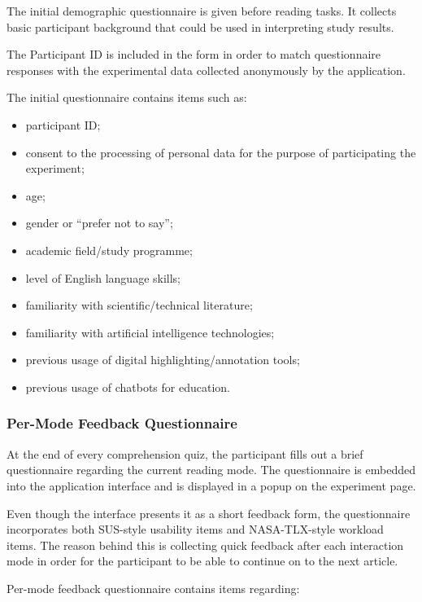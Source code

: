 \documentclass{IEEEtran}
\begin{document}
The initial demographic questionnaire is given before reading tasks. It collects basic participant background that could be used in interpreting study results.

The Participant ID is included in the form in order to match questionnaire responses with the experimental data collected anonymously by the application.

The initial questionnaire contains items such as:

\begin{itemize}
    \item participant ID;
    \item consent to the processing of personal data for the purpose of participating the experiment;
    \item age;
    \item gender or “prefer not to say”;
    \item academic field/study programme;
    \item level of English language skills;
    \item familiarity with scientific/technical literature;
    \item familiarity with artificial intelligence technologies;
    \item previous usage of digital highlighting/annotation tools;
    \item previous usage of chatbots for education.
    
\end{itemize}

\subsubsection{Per-Mode Feedback Questionnaire}

At the end of every comprehension quiz, the participant fills out a brief questionnaire regarding the current reading mode. The questionnaire is embedded into the application interface and is displayed in a popup on the experiment page.

Even though the interface presents it as a short feedback form, the questionnaire incorporates both SUS-style usability items and NASA-TLX-style workload items. The reason behind this is collecting quick feedback after each interaction mode in order for the participant to be able to continue on to the next article.

Per-mode feedback questionnaire contains items regarding:
\end{document}
